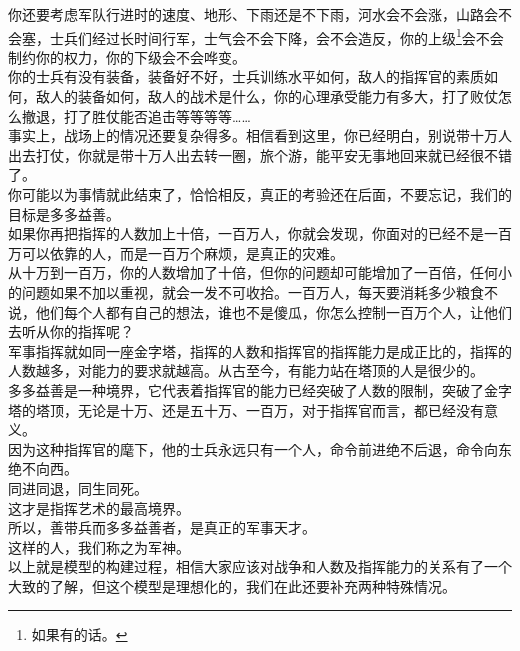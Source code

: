 \begin{multicols}{\theparacolNo}
你还要考虑军队行进时的速度、地形、下雨还是不下雨，河水会不会涨，山路会不会塞，士兵们经过长时间行军，士气会不会下降，会不会造反，你的上级\footnote{如果有的话。}会不会制约你的权力，你的下级会不会哗变。\\

你的士兵有没有装备，装备好不好，士兵训练水平如何，敌人的指挥官的素质如何，敌人的装备如何，敌人的战术是什么，你的心理承受能力有多大，打了败仗怎么撤退，打了胜仗能否追击等等等等……\\

事实上，战场上的情况还要复杂得多。相信看到这里，你已经明白，别说带十万人出去打仗，你就是带十万人出去转一圈，旅个游，能平安无事地回来就已经很不错了。\\

你可能以为事情就此结束了，恰恰相反，真正的考验还在后面，不要忘记，我们的目标是多多益善。\\

如果你再把指挥的人数加上十倍，一百万人，你就会发现，你面对的已经不是一百万可以依靠的人，而是一百万个麻烦，是真正的灾难。\\

从十万到一百万，你的人数增加了十倍，但你的问题却可能增加了一百倍，任何小的问题如果不加以重视，就会一发不可收拾。一百万人，每天要消耗多少粮食不说，他们每个人都有自己的想法，谁也不是傻瓜，你怎么控制一百万个人，让他们去听从你的指挥呢？\\

军事指挥就如同一座金字塔，指挥的人数和指挥官的指挥能力是成正比的，指挥的人数越多，对能力的要求就越高。从古至今，有能力站在塔顶的人是很少的。\\

多多益善是一种境界，它代表着指挥官的能力已经突破了人数的限制，突破了金字塔的塔顶，无论是十万、还是五十万、一百万，对于指挥官而言，都已经没有意义。\\

因为这种指挥官的麾下，他的士兵永远只有一个人，命令前进绝不后退，命令向东绝不向西。\\

同进同退，同生同死。\\

这才是指挥艺术的最高境界。\\

所以，善带兵而多多益善者，是真正的军事天才。\\

这样的人，我们称之为军神。\\

以上就是模型的构建过程，相信大家应该对战争和人数及指挥能力的关系有了一个大致的了解，但这个模型是理想化的，我们在此还要补充两种特殊情况。\\


\end{multicols}
